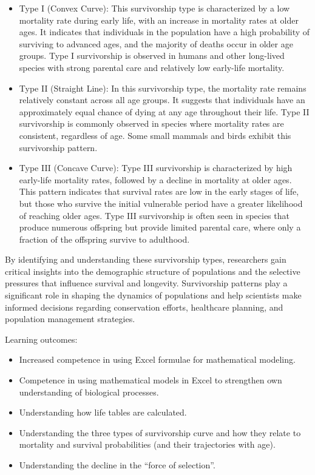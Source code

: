 \documentclass[
  a4paper]{book}
\providecommand{\tightlist}{%
  \setlength{\itemsep}{0pt}\setlength{\parskip}{0pt}}
\begin{document}
\begin{itemize}
\tightlist
\item
  Type I (Convex Curve): This survivorship type is characterized by a low mortality rate during early life, with an increase in mortality rates at older ages. It indicates that individuals in the population have a high probability of surviving to advanced ages, and the majority of deaths occur in older age groups. Type I survivorship is observed in humans and other long-lived species with strong parental care and relatively low early-life mortality.
\item
  Type II (Straight Line): In this survivorship type, the mortality rate remains relatively constant across all age groups. It suggests that individuals have an approximately equal chance of dying at any age throughout their life. Type II survivorship is commonly observed in species where mortality rates are consistent, regardless of age. Some small mammals and birds exhibit this survivorship pattern.
\item
  Type III (Concave Curve): Type III survivorship is characterized by high early-life mortality rates, followed by a decline in mortality at older ages. This pattern indicates that survival rates are low in the early stages of life, but those who survive the initial vulnerable period have a greater likelihood of reaching older ages. Type III survivorship is often seen in species that produce numerous offspring but provide limited parental care, where only a fraction of the offspring survive to adulthood.
\end{itemize}

By identifying and understanding these survivorship types, researchers gain critical insights into the demographic structure of populations and the selective pressures that influence survival and longevity. Survivorship patterns play a significant role in shaping the dynamics of populations and help scientists make informed decisions regarding conservation efforts, healthcare planning, and population management strategies.

\begin{do-something}
Learning outcomes:

\begin{itemize}
\tightlist
\item
  Increased competence in using Excel formulae for mathematical
  modeling.
\item
  Competence in using mathematical models in Excel to strengthen own
  understanding of biological processes.
\item
  Understanding how life tables are calculated.
\item
  Understanding the three types of survivorship curve and how they
  relate to mortality and survival probabilities (and their trajectories
  with age).
\item
  Understanding the decline in the ``force of selection''.
\end{itemize}
\end{do-something}
\end{document}
